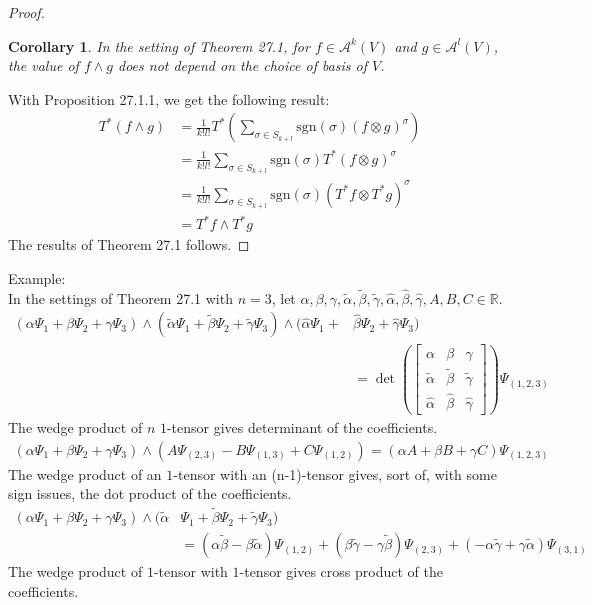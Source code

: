 \documentclass[15pt]{book}
\theoremstyle{break}
\theoremstyle{break}
\newtheorem{corT}[lem]{Corollary}
\newcommand{\R}{\mathbb{R}}
\newcommand{\A}{\mathcal{A}}
\newcommand{\that}[1]{\widetilde{#1}}
\newcommand{\lr}[1]{\left(#1\right)}
\newcommand{\bmat}[1]{\begin{bmatrix} #1 \end{bmatrix}}
\newcommand{\example}{\color{green}Example: \color{black}}
\begin{document}
\begin{proof}
\begin{corT}
\setlength{\leftskip}{1cm} In the setting of Theorem 27.1, for $f \in \A^{k}(V)$ and $g \in \A^l(V)$, the value of $f \wedge g$ does not depend on the choice of basis of $V$.
\end{corT}
With Proposition 27.1.1, we get the following result:
\begin{align*}
T^*(f \wedge g) &= \frac{1}{k!l!} T^*\left(\sum_{\sigma \in S_{k+l}} \text{sgn}(\sigma) (f\otimes g)^\sigma\right)\\
&= \frac{1}{k!l!}\sum_{\sigma \in S_{k+l}} \text{sgn}(\sigma)T^*(f\otimes g)^\sigma\\
&= \frac{1}{k!l!}\sum_{\sigma \in S_{k+l}} \text{sgn}(\sigma)(T^*f \otimes T^* g)^\sigma\\
&= T^*f \wedge T^*g
\end{align*}
The results of Theorem 27.1 follows. 
\end{proof}

\hfill\break
\hfill\break
\hfill\break
\example\\
In the settings of Theorem 27.1 with $n=3$, let $\alpha, \beta, \gamma , \that{\alpha},\that{\beta},\that{\gamma}, \hat{\alpha},\hat{\beta},\hat{\gamma},A,B,C \in \R$.
\begin{align*}
(\alpha \Psi_1 + \beta \Psi_2 + \gamma \Psi_3) \wedge ( \that{\alpha} \Psi_1 + \that{\beta} \Psi_2 + \that{\gamma} \Psi_3) \wedge(\hat{\alpha}\Psi_1 + &\hat{\beta}\Psi_2 + \hat{\gamma}\Psi_3)  \\
&= \det\lr{\bmat{\alpha & \beta & \gamma \\ \that{\alpha}& \that{\beta}& \that{\gamma} \\ \hat{\alpha}& \hat{\beta}&\hat{\gamma}}} \Psi_{(1,2,3)}
\end{align*}
The wedge product of $n$ $1$-tensor gives determinant of the coefficients.
\begin{align*}
(\alpha \Psi_1 +\beta \Psi_2 + \gamma \Psi_3)\wedge (A\Psi_{(2,3)}-B\Psi_{(1,3)}+C\Psi_{(1,2)}) = (\alpha A + \beta B + \gamma C)\Psi_{(1,2,3)}
\end{align*}
The wedge product of an $1$-tensor with an (n-1)-tensor gives, sort of, with some sign issues, the dot product of the coefficients.
\begin{align*}
(\alpha \Psi_1 + \beta \Psi_2 +\gamma \Psi_3) \wedge (\that{\alpha} &\Psi_1 + \that{\beta} \Psi_2 + \that{\gamma} \Psi_3) \\
&= (\alpha \that{\beta} - \beta \that{\alpha})\Psi_{(1,2)} + (\beta \that{\gamma} - \gamma \that{\beta}) \Psi_{(2,3)} + (-\alpha \that{\gamma} + \gamma \that{\alpha}) \Psi_{(3,1)}
\end{align*}
The wedge product of $1$-tensor with $1$-tensor gives cross product of the coefficients. 
\end{document}
